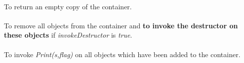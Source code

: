 \\
To return an empty copy of the container. \\

\\
To remove all objects from the container and {\bf to invoke the
destructor on these objects} if {\em invokeDestructor} is {\em true}. \\

\\
To invoke {\em Print(s,flag)} on all objects which have been added to
the container. 





